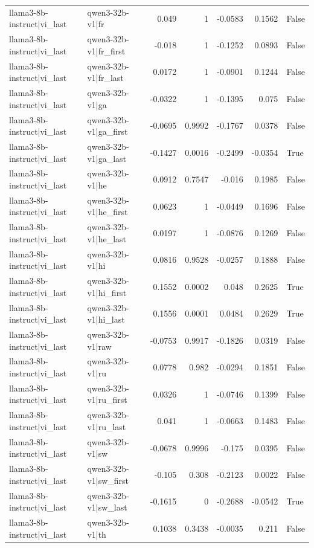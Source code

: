 \begin{table}
\begin{tabular}{l l r r r r l}
llama3-8b-instruct|vi_last & qwen3-32b-v1|fr & 0.049 & 1 & -0.0583 & 0.1562 & False \\
llama3-8b-instruct|vi_last & qwen3-32b-v1|fr_first & -0.018 & 1 & -0.1252 & 0.0893 & False \\
llama3-8b-instruct|vi_last & qwen3-32b-v1|fr_last & 0.0172 & 1 & -0.0901 & 0.1244 & False \\
llama3-8b-instruct|vi_last & qwen3-32b-v1|ga & -0.0322 & 1 & -0.1395 & 0.075 & False \\
llama3-8b-instruct|vi_last & qwen3-32b-v1|ga_first & -0.0695 & 0.9992 & -0.1767 & 0.0378 & False \\
llama3-8b-instruct|vi_last & qwen3-32b-v1|ga_last & -0.1427 & 0.0016 & -0.2499 & -0.0354 & True \\
llama3-8b-instruct|vi_last & qwen3-32b-v1|he & 0.0912 & 0.7547 & -0.016 & 0.1985 & False \\
llama3-8b-instruct|vi_last & qwen3-32b-v1|he_first & 0.0623 & 1 & -0.0449 & 0.1696 & False \\
llama3-8b-instruct|vi_last & qwen3-32b-v1|he_last & 0.0197 & 1 & -0.0876 & 0.1269 & False \\
llama3-8b-instruct|vi_last & qwen3-32b-v1|hi & 0.0816 & 0.9528 & -0.0257 & 0.1888 & False \\
llama3-8b-instruct|vi_last & qwen3-32b-v1|hi_first & 0.1552 & 0.0002 & 0.048 & 0.2625 & True \\
llama3-8b-instruct|vi_last & qwen3-32b-v1|hi_last & 0.1556 & 0.0001 & 0.0484 & 0.2629 & True \\
llama3-8b-instruct|vi_last & qwen3-32b-v1|raw & -0.0753 & 0.9917 & -0.1826 & 0.0319 & False \\
llama3-8b-instruct|vi_last & qwen3-32b-v1|ru & 0.0778 & 0.982 & -0.0294 & 0.1851 & False \\
llama3-8b-instruct|vi_last & qwen3-32b-v1|ru_first & 0.0326 & 1 & -0.0746 & 0.1399 & False \\
llama3-8b-instruct|vi_last & qwen3-32b-v1|ru_last & 0.041 & 1 & -0.0663 & 0.1483 & False \\
llama3-8b-instruct|vi_last & qwen3-32b-v1|sw & -0.0678 & 0.9996 & -0.175 & 0.0395 & False \\
llama3-8b-instruct|vi_last & qwen3-32b-v1|sw_first & -0.105 & 0.308 & -0.2123 & 0.0022 & False \\
llama3-8b-instruct|vi_last & qwen3-32b-v1|sw_last & -0.1615 & 0 & -0.2688 & -0.0542 & True \\
llama3-8b-instruct|vi_last & qwen3-32b-v1|th & 0.1038 & 0.3438 & -0.0035 & 0.211 & False \\

\end{tabular}
\end{table}
